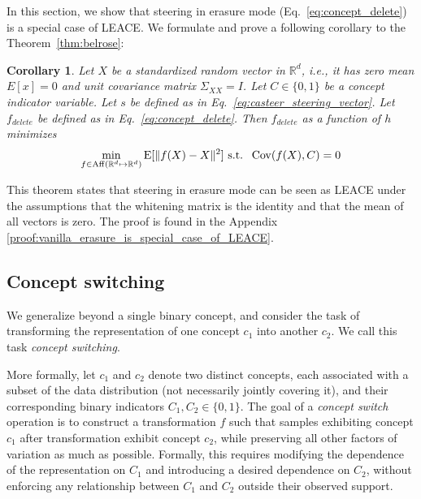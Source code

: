 \documentclass{article}
\theoremstyle{plain}
\newtheorem{corollary}[theorem]{Corollary}
\theoremstyle{definition}
\theoremstyle{remark}
\newcommand{\cov}{\mathrm{Cov}}
\begin{document}
In this section, we show that steering in erasure mode (Eq.~\ref{eq:concept_delete}) is a special case of LEACE. We formulate and prove a following corollary to the Theorem~\ref{thm:belrose}:
\begin{corollary}
	\label{cor:vanilla_erasure_is_special_case_of_LEACE}
    Let $X$ be a standardized random vector in $\mathbb{R}^d$, i.e., it has zero mean $E[x] = 0$ and unit covariance matrix $\Sigma_{XX} = I$. Let $C \in \{0, 1\}$ be a concept indicator variable.
    Let $s$ be defined as in Eq.~\ref{eq:casteer_steering_vector}.
    Let $f_{delete}$ be defined as in Eq.~\ref{eq:concept_delete}.
    Then $f_{delete}$ as a function of $h$ minimizes
\begin{equation}
	\label{eq:vanilla_erasure_is_special_case_of_LEACE}
    \min_{f \in \mathrm{Aff}(\mathbb{R}^d \mapsto \mathbb{R}^d)} \mathrm{E}[\lVert{f(X) - X}\rVert^2] \  \\
    \text{ s.t. } \  \cov(f(X), C) = 0
\end{equation}
\label{thm:vanilla_steering_is_a_special_case_leace}
\end{corollary}
This theorem states that steering in erasure mode can be seen as LEACE under the assumptions that the whitening matrix is the identity and that the mean of all vectors is zero. The proof is found in the Appendix \ref{proof:vanilla_erasure_is_special_case_of_LEACE}.

\subsection{Concept switching}

We generalize beyond a single binary concept, and consider the task of transforming the representation of one concept $c_1$ into another $c_2$. We call this task \textit{concept switching}. 

More formally, let $c_1$ and $c_2$ denote two distinct concepts, each associated with a subset of the data distribution (not necessarily jointly covering it), and their corresponding binary indicators $C_1, C_2 \in \{0,1\}$. The goal of a \emph{concept switch} operation is to construct a transformation $f$ such that samples exhibiting concept $c_1$ after transformation exhibit concept $c_2$, while preserving all other factors of variation as much as possible. Formally, this requires modifying the dependence of the representation on $C_1$ and introducing a desired dependence on $C_2$, without enforcing any relationship between $C_1$ and $C_2$ outside their observed support.
\end{document}

